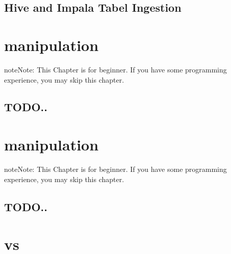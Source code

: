 \documentclass[letterpaper,12pt,english]{sphinxmanual}
\begin{document}
\section{Hive and Impala Tabel Ingestion}
\label{\detokenize{ingest:hive-and-impala-tabel-ingestion}}
\begin{figure}[htbp]
\centering

\noindent{}
\end{figure}


\chapter{ manipulation}
\label{\detokenize{pd:pd-dataframe-manipulation}}\label{\detokenize{pd:pd}}\label{\detokenize{pd::doc}}
\begin{sphinxadmonition}{note}{Note:}
This Chapter {\hyperref[\detokenize{nb:nb}]{}} is for beginner.  If you have some  programming experience, you may skip this chapter.
\end{sphinxadmonition}


\section{TODO..}
\label{\detokenize{pd:todo}}

\chapter{ manipulation}
\label{\detokenize{rdd:rdd-dataframe-manipulation}}\label{\detokenize{rdd:rdd}}\label{\detokenize{rdd::doc}}
\begin{sphinxadmonition}{note}{Note:}
This Chapter {\hyperref[\detokenize{nb:nb}]{}} is for beginner.  If you have some  programming experience, you may skip this chapter.
\end{sphinxadmonition}


\section{TODO..}
\label{\detokenize{rdd:todo}}

\chapter{ vs }
\label{\detokenize{pdrdd:pd-dataframe-vs-pd-dataframe}}\label{\detokenize{pdrdd:pdrdd}}\label{\detokenize{pdrdd::doc}}
\end{document}
